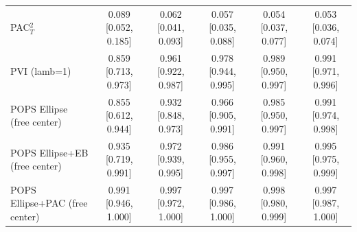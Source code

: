 \begin{tabular}{lccccc}
PAC$^2_T$ & 0.089 {\scriptsize[0.052, 0.185]} & 0.062 {\scriptsize[0.041, 0.093]} & 0.057 {\scriptsize[0.035, 0.088]} & 0.054 {\scriptsize[0.037, 0.077]} & 0.053 {\scriptsize[0.036, 0.074]} \\
PVI (lamb=1) & 0.859 {\scriptsize[0.713, 0.973]} & 0.961 {\scriptsize[0.922, 0.987]} & 0.978 {\scriptsize[0.944, 0.995]} & 0.989 {\scriptsize[0.950, 0.997]} & 0.991 {\scriptsize[0.971, 0.996]} \\
POPS Ellipse (free center) & 0.855 {\scriptsize[0.612, 0.944]} & 0.932 {\scriptsize[0.848, 0.973]} & 0.966 {\scriptsize[0.905, 0.991]} & 0.985 {\scriptsize[0.950, 0.997]} & 0.991 {\scriptsize[0.974, 0.998]} \\
POPS Ellipse+EB (free center) & 0.935 {\scriptsize[0.719, 0.991]} & 0.972 {\scriptsize[0.939, 0.995]} & 0.986 {\scriptsize[0.955, 0.997]} & 0.991 {\scriptsize[0.960, 0.998]} & 0.995 {\scriptsize[0.975, 0.999]} \\
POPS Ellipse+PAC (free center) & 0.991 {\scriptsize[0.946, 1.000]} & 0.997 {\scriptsize[0.972, 1.000]} & 0.997 {\scriptsize[0.986, 1.000]} & 0.998 {\scriptsize[0.980, 0.999]} & 0.997 {\scriptsize[0.987, 1.000]} \\
\bottomrule
\end{tabular}

